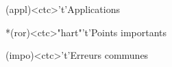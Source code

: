 \documentclass[../../main/main.tex]{subfiles}
\begin{document}
\begin{tcn}[sidebyside, fontupper=\small, fontlower=\small]
	\begin{tcn}(appl)<ctc>'t'{Applications}
	\end{tcn}
	\begin{tcn}*(ror)<ctc>"hart"'t'{Points importants}
	\end{tcn}
	\begin{tcn}(impo)<ctc>'t'{Erreurs communes}
	\end{tcn}
\end{tcn}

\vspace*{\fill}
\newpage

\end{document}
